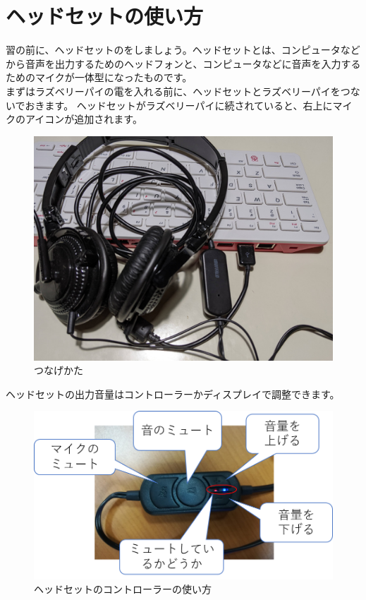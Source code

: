\section{ヘッドセットの使い方}
習の前に、ヘッドセットのをしましょう。ヘッドセットとは、コンピュータなどから音声を出力するためのヘッドフォンと、コンピュータなどに音声を入力するためのマイクが一体型になったものです。\\
まずはラズベリーパイの電を入れる前に、ヘッドセットとラズベリーパイをつないでおきます。
ヘッドセットがラズベリーパイに続されていると、右上にマイクのアイコンが追加されます。

\begin{figure}[H]
\begin{center}
    \includegraphics[width=\linewidth]{images/how_to_connect_headset.jpg}
    \caption{つなげかた}
    \label{つなげかた}
\end{center}
\end{figure}

ヘッドセットの出力音量はコントローラーかディスプレイで調整できます。

\begin{figure}[H]
\begin{center}
    \includegraphics[width=\linewidth]{images/chap06/text06-img004.png}
    \caption{ヘッドセットのコントローラーの使い方}
    \label{ヘッドセットのコントローラーの使い方}
\end{center}
\end{figure}


